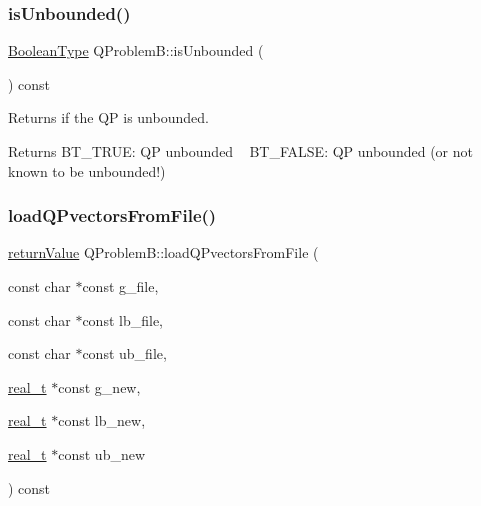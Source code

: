 \subsubsection{\texorpdfstring{is\+Unbounded()}{isUnbounded()}}
{\footnotesize\ttfamily \hyperlink{_types_8hpp_a20f82124c82b6f5686a7fce454ef9089}{Boolean\+Type} Q\+Problem\+B\+::is\+Unbounded (\begin{DoxyParamCaption}{ }\end{DoxyParamCaption}) const\hspace{0.3cm}{\ttfamily [inline]}}

Returns if the QP is unbounded. \begin{DoxyReturn}{Returns}
B\+T\+\_\+\+T\+R\+UE\+: QP unbounded ~\newline
 B\+T\+\_\+\+F\+A\+L\+SE\+: QP unbounded (or not known to be unbounded!) 
\end{DoxyReturn}
\mbox{\label{class_q_problem_b_a50f4ae650239798b58979714bb35e51a}} 
\subsubsection{\texorpdfstring{load\+Q\+Pvectors\+From\+File()}{loadQPvectorsFromFile()}}
{\footnotesize\ttfamily \hyperlink{_message_handling_8hpp_a81d556f613bfbabd0b1f9488c0fa865e}{return\+Value} Q\+Problem\+B\+::load\+Q\+Pvectors\+From\+File (\begin{DoxyParamCaption}\item[{const char $\ast$const}]{g\+\_\+file,  }\item[{const char $\ast$const}]{lb\+\_\+file,  }\item[{const char $\ast$const}]{ub\+\_\+file,  }\item[{\hyperlink{qp_o_a_s_e_s__wrapper_8h_a0d00e2b3dfadee81331bbb39068570c4}{real\+\_\+t} $\ast$const}]{g\+\_\+new,  }\item[{\hyperlink{qp_o_a_s_e_s__wrapper_8h_a0d00e2b3dfadee81331bbb39068570c4}{real\+\_\+t} $\ast$const}]{lb\+\_\+new,  }\item[{\hyperlink{qp_o_a_s_e_s__wrapper_8h_a0d00e2b3dfadee81331bbb39068570c4}{real\+\_\+t} $\ast$const}]{ub\+\_\+new }\end{DoxyParamCaption}) const\hspace{0.3cm}{\ttfamily [protected]}}

